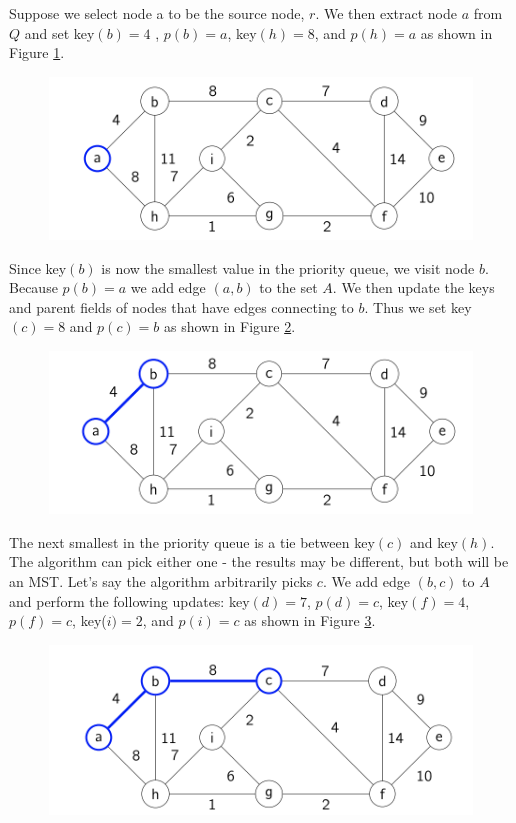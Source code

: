 \documentclass [12pt]{article}
\theoremstyle{definition}
\begin{document}
Suppose we select node a to be the source node, $r$. We then extract node $a$ from $Q$ and set key$(b) = 4$ , $p(b) = a$, key$(h) = 8$, and $p(h) = a$ as shown in Figure \ref{fig:prims_2}.

\begin{figure}[h!]
\centering
\includegraphics[scale=0.8]{prims_2.png}
\caption{}
\label{fig:prims_2}
\end{figure}

Since key$(b)$ is now the smallest value in the priority queue, we visit node $b$. Because $p(b) = a$ we add edge $(a, b)$ to the set $A$. We then update the keys and parent fields of nodes that have edges connecting to $b$. Thus we set key$(c) = 8$ and $p(c) = b$ as shown in Figure \ref{fig:prims_3}.

\begin{figure}[h!]
\centering
\includegraphics[scale=0.8]{prims_3.png}
\caption{}
\label{fig:prims_3}
\end{figure}

The next smallest in the priority queue is a tie between key$(c)$ and key$(h)$. The algorithm can pick either one - the results may be different, but both will be an MST. Let's say the algorithm arbitrarily picks $c$. We add edge $(b, c)$ to $A$ and perform the following updates: key$(d) = 7$, $p(d) = c$, key$(f ) = 4$, $p(f ) = c$, key($i) = 2$, and $p(i) = c$ as shown in Figure \ref{fig:prims_4}.

\begin{figure}[h!]
\centering
\includegraphics[scale=0.8]{prims_4.png}
\caption{}
\label{fig:prims_4}
\end{figure}
\end{document}
